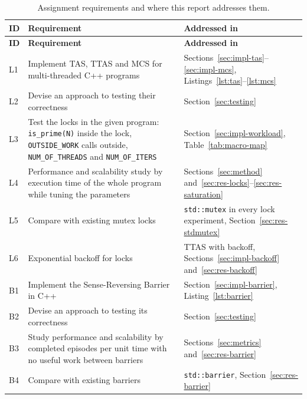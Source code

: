 {\small
\begin{longtable}{|>{\raggedright\arraybackslash}p{}|>{\raggedright\arraybackslash}p{}|>{\raggedright\arraybackslash}p{}|}
\caption[Assignment requirements and where this report addresses them]{Assignment requirements\cite{r1} and where this report addresses them.}\label{tab:requirements} \\
\hline
\textbf{ID} & \textbf{Requirement} & \textbf{Addressed in} \\ \hline
\endfirsthead
\hline
\textbf{ID} & \textbf{Requirement} & \textbf{Addressed in} \\ \hline
\endhead
L1 & Implement TAS, TTAS and MCS for multi-threaded C++ programs & Sections~\ref{sec:impl-tas}--\ref{sec:impl-mcs}, Listings~\ref{lst:tas}--\ref{lst:mcs} \\ \hline
L2 & Devise an approach to testing their correctness & Section~\ref{sec:testing} \\ \hline
L3 & Test the locks in the given program: \texttt{is\_prime(N)} inside the lock, \texttt{OUTSIDE\_WORK} calls outside, \texttt{NUM\_OF\_THREADS} and \texttt{NUM\_OF\_ITERS} & Section~\ref{sec:impl-workload}, Table~\ref{tab:macro-map} \\ \hline
L4 & Performance and scalability study by execution time of the whole program while tuning the parameters & Sections~\ref{sec:method} and~\ref{sec:res-locks}--\ref{sec:res-saturation} \\ \hline
L5 & Compare with existing mutex locks & \texttt{std::mutex} in every lock experiment, Section~\ref{sec:res-stdmutex} \\ \hline
L6 & Exponential backoff for locks & TTAS with backoff, Sections~\ref{sec:impl-backoff} and~\ref{sec:res-backoff} \\ \hline
B1 & Implement the Sense-Reversing Barrier in C++ & Section~\ref{sec:impl-barrier}, Listing~\ref{lst:barrier} \\ \hline
B2 & Devise an approach to testing its correctness & Section~\ref{sec:testing} \\ \hline
B3 & Study performance and scalability by completed episodes per unit time with no useful work between barriers & Sections~\ref{sec:metrics} and~\ref{sec:res-barrier} \\ \hline
B4 & Compare with existing barriers & \texttt{std::barrier}, Section~\ref{sec:res-barrier} \\ \hline

\end{longtable}}
